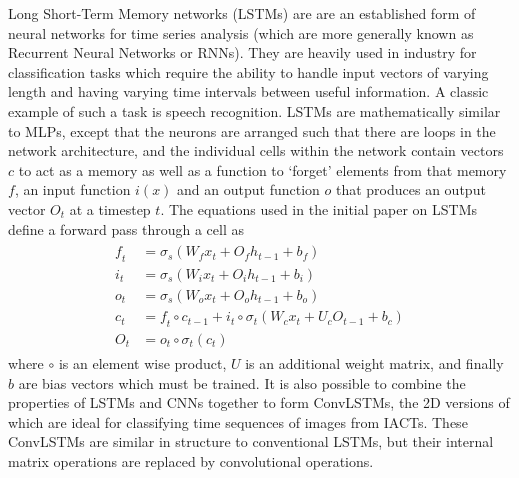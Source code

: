 Long Short-Term Memory networks (LSTMs) are are an established form of neural networks for time series analysis (which are more generally known as Recurrent Neural Networks or RNNs). They are heavily used in industry for classification tasks which require the ability to handle input vectors of varying length and having varying time intervals between useful information. A classic example of such a task is speech recognition.
LSTMs are mathematically similar to MLPs, except that the neurons are arranged such that there are loops in the network architecture, and the individual cells within the network contain vectors $\textit{c}$ to act as a memory as well as a function to `forget' elements from that memory $\textit{f}$, an input function $\textit{i}(x)$ and an output function $\textit{o}$ that produces an output vector $O_t$ at a timestep $t$. The equations used in the initial paper on LSTMs define a forward pass through a cell \cite{Hochreiter} as
\begin{align}
\begin{split}
\textit{f}_t &= \sigma_s(W_{f} x_t + O_{f} h_{t-1} + b_f) \\
\textit{i}_t &= \sigma_s(W_{i} x_t + O_{i} h_{t-1} + b_i) \\
\textit{o}_t &= \sigma_s(W_{o} x_t + O_{o} h_{t-1} + b_o) \\
\textit{c}_t &= \textit{f}_t \circ c_{t-1} + \textit{i}_t \circ \sigma_t(W_{c} x_t + U_{c} O_{t-1} + b_c) \\
O_t &= o_t \circ \sigma_t(\textit{c}_t)
\end{split}
\end{align}
where $\circ$ is an element wise product, $U$ is an additional weight matrix, and finally $b$ are bias vectors which must be trained. It is also possible to combine the properties of LSTMs and CNNs together to form ConvLSTMs, the 2D versions of which are ideal for classifying time sequences of images from IACTs. These ConvLSTMs are similar in structure to conventional LSTMs, but their internal matrix operations are replaced by convolutional operations. 
